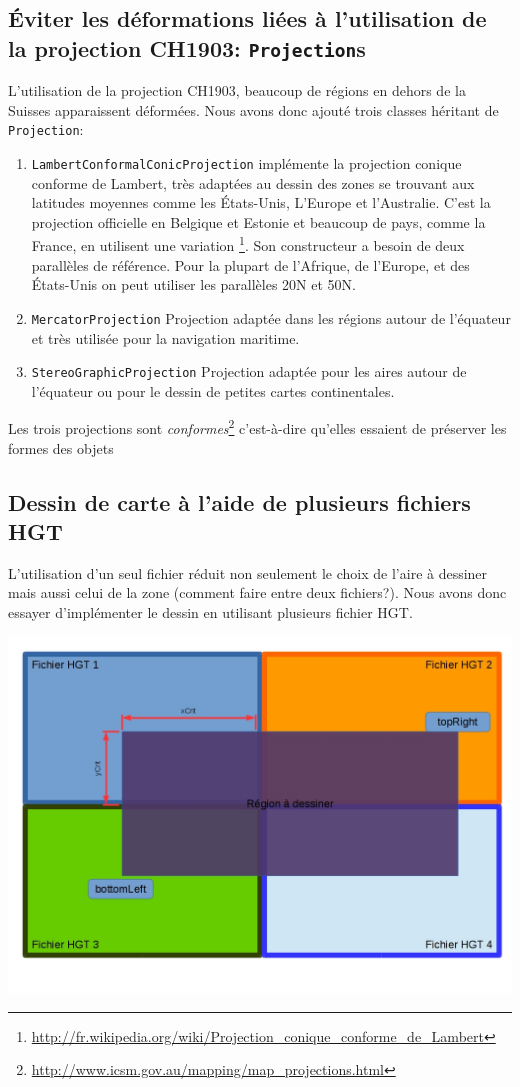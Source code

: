\documentclass[11pt,a4paper]{article}
\begin{document}
\subsection{Éviter les déformations liées à l'utilisation de la projection CH1903: \texttt{Projection}s}
L'utilisation de la projection CH1903, beaucoup de régions en dehors de la Suisses apparaissent déformées. Nous avons donc ajouté trois classes héritant de \texttt{Projection}:
\begin{enumerate}
    \item \texttt{LambertConformalConicProjection} implémente la projection conique conforme de Lambert, très adaptées au dessin des zones se trouvant aux latitudes moyennes comme les États-Unis, L'Europe et l'Australie. C'est la projection officielle en Belgique et Estonie et beaucoup de pays, comme la France, en utilisent une variation \footnote{\url{http://fr.wikipedia.org/wiki/Projection_conique_conforme_de_Lambert}}. Son constructeur a besoin de deux parallèles de référence. Pour la plupart de l'Afrique, de l'Europe, et des États-Unis on peut utiliser les parallèles 20N et 50N. 
    \item \texttt{MercatorProjection} Projection adaptée dans les régions autour de l'équateur et très utilisée pour la navigation maritime.
    \item \texttt{StereoGraphicProjection} Projection adaptée pour les aires autour de l'équateur ou pour le dessin de petites cartes continentales.
\end{enumerate}
Les trois projections sont \textit{conformes}\footnote{\url{http://www.icsm.gov.au/mapping/map_projections.html}} c'est-à-dire qu'elles essaient de préserver les formes des objets

\subsection{Dessin de carte à l'aide de plusieurs fichiers HGT}
L'utilisation d'un seul fichier réduit non seulement le choix de l'aire à dessiner mais aussi celui de la zone (comment faire entre deux fichiers?). Nous avons donc essayer d'implémenter le dessin en utilisant plusieurs fichier HGT.

\begin{center}
\includegraphics[scale=0.3]{schema4files.jpg}
\end{center}
\end{document}
